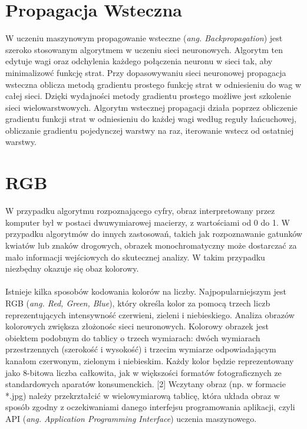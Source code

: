 \documentclass[openright]{xmgr}
\begin{document}
\section{Propagacja Wsteczna\label{s:dsssl}}

\indent \indent W uczeniu maszynowym propagowanie wsteczne (\textit{ang. Backpropagation}) jest szeroko stosowanym algorytmem w uczeniu sieci neuronowych. Algorytm ten edytuje wagi oraz odchylenia każdego połączenia neuronu w sieci tak, aby minimalizowć funkcję strat. Przy dopasowywaniu sieci neuronowej propagacja wsteczna oblicza metodą gradientu prostego funkcję strat w odniesieniu do wag w całej sieci. Dzięki wydajności metody gradientu prostego możliwe jest szkolenie sieci wielowarstwowych. Algorytm wstecznej propagacji działa poprzez obliczenie gradientu funkcji strat w odniesieniu do każdej wagi według reguły łańcuchowej, obliczanie gradientu pojedynczej warstwy na raz, iterowanie wstecz od ostatniej warstwy. 


\section{RGB\label{s:dsssl}}
\indent \indent W przypadku algorytmu rozpoznającego cyfry, obraz interpretowany przez komputer był w postaci dwuwymiarowej macierzy, z wartościami od 0 do 1. W przypadku algorytmów do innych zastosowań, takich jak rozpoznawanie gatunków kwiatów lub znaków drogowych, obrazek monochromatyczny może dostarczać za mało informacji wejściowych do skutecznej analizy. W takim przypadku niezbędny okazuje się obaz kolorowy. 
\\
\\
\indent \indent Istnieje kilka sposobów kodowania kolorów na liczby. Najpopularniejszym jest
RGB (\textit{ang. Red, Green, Blue}), który określa kolor za pomocą trzech liczb reprezentujących intensywność czerwieni, zieleni i niebieskiego. Analiza obrazów kolorowych zwiększa złożonośc sieci neuronowych. Kolorowy obrazek jest obiektem podobnym do tablicy o trzech wymiarach: dwóch wymiarach przestrzennych (szerokość i wysokość) i trzecim wymiarze odpowiadającym kanałom czerwonym, zielonym i niebieskim. Każdy kolor będzie reprezentowany jako 8-bitowa liczba całkowita, jak w większości formatów fotograficznych ze standardowych aparatów konsumenckich. [2] Wczytany obraz (np. w formacie *.jpg) należy przekrztałcić w wielowymiarową tablicę, która układa obraz w sposób zgodny z oczekiwaniami danego interfejsu programowania aplikacji, czyli API (\textit{ang. Application Programming Interface}) uczenia maszynowego.
\clearpage
\end{document}
